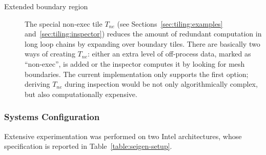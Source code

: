 \begin{description}
\item[Extended boundary region] The special non-exec tile $T_{ne}$ (see Sections~\ref{sec:tiling:examples} and~\ref{sec:tiling:inspector}) reduces the amount of redundant computation in long loop chains by expanding over boundary tiles. There are basically two ways of creating $T_{ne}$: either an extra level of off-process data, marked as ``non-exec'', is added or the inspector computes it by looking for mesh boundaries. The current implementation only supports the first option; deriving $T_{ne}$ during inspection would be not only algorithmically complex, but also computationally expensive.
\end{description}



\subsubsection{Systems Configuration}
Extensive experimentation was performed on two Intel architectures, whose specification is reported in Table~\ref{table:seigen-setup}. 

\begin{table}[htpb]
\scriptsize
{}
\caption{Systems specification.}
\label{table:seigen-setup}
\end{table}

